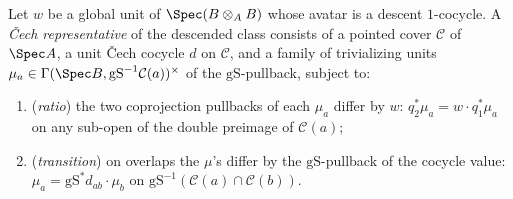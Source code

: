 \begin{definition}
  \label{def:DescentClassRep}
  \leanok
  Let \(w\) be a global unit of \(\Spec(B \otimes_A B)\) whose avatar is a descent
  \(1\)-cocycle.  A \emph{\v Cech representative} of the descended class consists of a pointed
  cover \(\mathcal C\) of \(\Spec A\), a unit \v Cech cocycle \(d\) on \(\mathcal C\), and a
  family of trivializing units \(\mu_a \in \Gamma(\Spec B, \mathrm{gS}^{-1}\mathcal
  C(a))^{\times}\) of the \(\mathrm{gS}\)-pullback, subject to:
  \begin{enumerate}
    \item (\emph{ratio}) the two coprojection pullbacks of each \(\mu_a\) differ by \(w\):
      \(q_2^{*}\mu_a = w \cdot q_1^{*}\mu_a\) on any sub-open of the double preimage of
      \(\mathcal C(a)\);
    \item (\emph{transition}) on overlaps the \(\mu\)'s differ by the \(\mathrm{gS}\)-pullback
      of the cocycle value: \(\mu_a = \mathrm{gS}^{*} d_{ab} \cdot \mu_b\) on \(\mathrm{gS}^{-1}
      (\mathcal C(a) \cap \mathcal C(b))\).
  \end{enumerate}
\end{definition}

